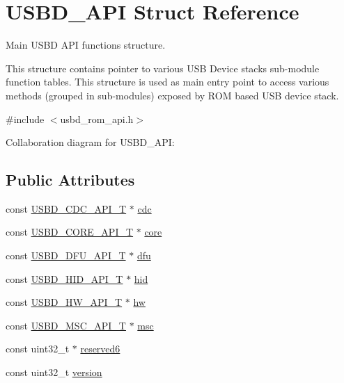 \hypertarget{structUSBD__API}{}\section{U\+S\+B\+D\+\_\+\+A\+PI Struct Reference}
\label{structUSBD__API}


Main U\+S\+BD A\+PI functions structure.

This structure contains pointer to various U\+SB Device stack\textquotesingle{}s sub-\/module function tables. This structure is used as main entry point to access various methods (grouped in sub-\/modules) exposed by R\+OM based U\+SB device stack.  




{\ttfamily \#include $<$usbd\+\_\+rom\+\_\+api.\+h$>$}



Collaboration diagram for U\+S\+B\+D\+\_\+\+A\+PI\+:
\subsection*{Public Attributes}
\begin{DoxyCompactItemize}
\item 
const \hyperlink{group__USBD__CDC_gaad7f61aed01ad4130bee0f50b17eb716}{U\+S\+B\+D\+\_\+\+C\+D\+C\+\_\+\+A\+P\+I\+\_\+T} $\ast$ \hyperlink{structUSBD__API_a5560686e2f376096d2e1a640bb16bb84}{cdc}
\item 
const \hyperlink{group__USBD__Core_ga6a53e8395d1c68f98d18ca4a49b75baa}{U\+S\+B\+D\+\_\+\+C\+O\+R\+E\+\_\+\+A\+P\+I\+\_\+T} $\ast$ \hyperlink{structUSBD__API_a52b343de8166692bd2b4aecfb5eea59d}{core}
\item 
const \hyperlink{group__USBD__DFU_gadf9281f8af1223053e3ccf48e26ac80d}{U\+S\+B\+D\+\_\+\+D\+F\+U\+\_\+\+A\+P\+I\+\_\+T} $\ast$ \hyperlink{structUSBD__API_ade2d145690a4684babfc683b9cdec47f}{dfu}
\item 
const \hyperlink{group__USBD__HID_ga48d7b7f66a852d99dfbe2c419cc408ba}{U\+S\+B\+D\+\_\+\+H\+I\+D\+\_\+\+A\+P\+I\+\_\+T} $\ast$ \hyperlink{structUSBD__API_add4c43d092004fe92e77152d970e877b}{hid}
\item 
const \hyperlink{group__USBD__HW_ga4df5b7beaddc4e9267c320d92b4434fc}{U\+S\+B\+D\+\_\+\+H\+W\+\_\+\+A\+P\+I\+\_\+T} $\ast$ \hyperlink{structUSBD__API_a80f452bd8ff7fdff6fb835beb5e3255c}{hw}
\item 
const \hyperlink{group__USBD__MSC_ga521bb0e0edf4060aeb10827c6c29f7cf}{U\+S\+B\+D\+\_\+\+M\+S\+C\+\_\+\+A\+P\+I\+\_\+T} $\ast$ \hyperlink{structUSBD__API_a0a7fefe527769345f3565fba289c8358}{msc}
\item 
const uint32\+\_\+t $\ast$ \hyperlink{structUSBD__API_a4761deeab24d9655d4ab471dee37fe9a}{reserved6}
\item 
const uint32\+\_\+t \hyperlink{structUSBD__API_a900209612d9df086dd044b630607955b}{version}
\end{DoxyCompactItemize}


